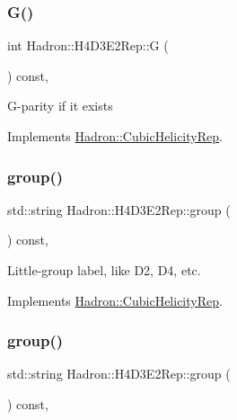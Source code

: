 \subsubsection{\texorpdfstring{G()}{G()}\hspace{0.1cm}{\footnotesize\ttfamily [3/3]}}
{\footnotesize\ttfamily int Hadron\+::\+H4\+D3\+E2\+Rep\+::G (\begin{DoxyParamCaption}{ }\end{DoxyParamCaption}) const\hspace{0.3cm}{\ttfamily [inline]}, {\ttfamily [virtual]}}

G-\/parity if it exists 

Implements \mbox{\hyperlink{structHadron_1_1CubicHelicityRep_a50689f42be1e6170aa8cf6ad0597018b}{Hadron\+::\+Cubic\+Helicity\+Rep}}.

\mbox{\label{structHadron_1_1H4D3E2Rep_a362911306406bcb51e8c6865513d5c44}} 
\subsubsection{\texorpdfstring{group()}{group()}\hspace{0.1cm}{\footnotesize\ttfamily [1/5]}}
{\footnotesize\ttfamily std\+::string Hadron\+::\+H4\+D3\+E2\+Rep\+::group (\begin{DoxyParamCaption}{ }\end{DoxyParamCaption}) const\hspace{0.3cm}{\ttfamily [inline]}, {\ttfamily [virtual]}}

Little-\/group label, like D2, D4, etc. 

Implements \mbox{\hyperlink{structHadron_1_1CubicHelicityRep_a101a7d76cd8ccdad0f272db44b766113}{Hadron\+::\+Cubic\+Helicity\+Rep}}.

\mbox{\label{structHadron_1_1H4D3E2Rep_a362911306406bcb51e8c6865513d5c44}} 
\subsubsection{\texorpdfstring{group()}{group()}\hspace{0.1cm}{\footnotesize\ttfamily [2/5]}}
{\footnotesize\ttfamily std\+::string Hadron\+::\+H4\+D3\+E2\+Rep\+::group (\begin{DoxyParamCaption}{ }\end{DoxyParamCaption}) const\hspace{0.3cm}{\ttfamily [inline]}, {\ttfamily [virtual]}}

